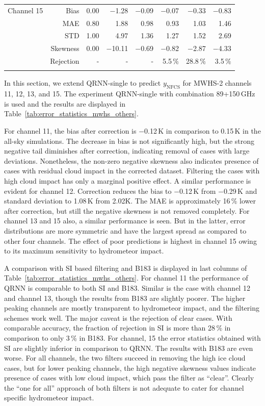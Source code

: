 \documentclass[amt, manuscript]{copernicus}
\newcommand{\ynfcs}{y_\text{NFCS}}
\begin{document}
\begin{table}[t]
\begin{tabular}{lrrr|rr|rr}
		\middlehline
		Channel 15  &  Bias     & 0.00 & $-$1.28 &$-$0.09 &$-$0.07 &$-$0.33 &$-$0.83\\
					&  MAE      & 0.80 &   1.88 &  0.98 &  0.93 &  1.03 &  1.46\\
					&  STD      & 1.00 &   4.97 &  1.36 &  1.27 &  1.52 &  2.69\\
					&  Skewness & 0.00 &$-$10.11 &$-$0.69 &$-$0.82 &$-$2.87 & $-$4.33 \\ 
					& Rejection & -     & -      & -	 & 5.5\,\% & 28.8\,\%& 3.5\,\%  \\
		\bottomhline
	\end{tabular}
\end{table}

In this section, we extend QRNN-single to predict $\ynfcs$ for MWHS-2 channels 11, 12, 13, and 15. The experiment QRNN-single with combination 89+150\,GHz is used and the results are displayed in Table~\ref{tab:error_statistics_mwhs_others}.

For channel 11, the bias after correction is $-$0.12\,K in comparison to 0.15\,K in the all-sky simulations. The decrease in bias is not significantly high, but the strong negative tail  diminishes after correction, indicating removal of cases with large deviations. Nonetheless, the non-zero negative skewness also indicates presence of cases with residual cloud impact in the corrected dataset. Filtering the cases with high cloud impact has only a marginal positive effect. A similar performance is evident for channel 12. Correction reduces the bias to $-$0.12\,K from $-$0.29\,K and standard deviation to 1.08\,K from 2.02\.K. The MAE is approximately 16\,\% lower after correction, but still the negative skewness is not removed completely. For channel 13 and 15 also, a similar performance is seen. But in the latter, error distributions are more symmetric and have the largest spread as compared to other four channels. The effect of poor predictions is highest in channel 15 owing to its maximum sensitivity to hydrometeor impact.

A comparison with SI based filtering and B183 is displayed in last columns of Table~\ref{tab:error_statistics_mwhs_others}. For channel 11 the performance of QRNN is comparable to both SI and B183. Similar is the case with channel 12 and channel 13, though the results from B183 are slightly poorer. The higher peaking channels are mostly transparent to hydrometeor impact, and the filtering schemes work well. The major caveat is the rejection of clear cases. With comparable accuracy, the fraction of rejection in SI is more than 28\,\% in comparison to only 3\,\% in B183. For channel, 15 the error statistics obtained with SI are slightly inferior in comparison to QRNN. The results with B183 are even worse. For all channels, the two filters succeed in removing the high ice cloud cases, but for lower peaking channels, the high negative skewness values indicate presence of cases with low cloud impact, which pass the filter as ``clear''. Clearly the ``one for all'' approach of both filters is not adequate to cater for channel specific hydrometeor impact.  
\end{document}
